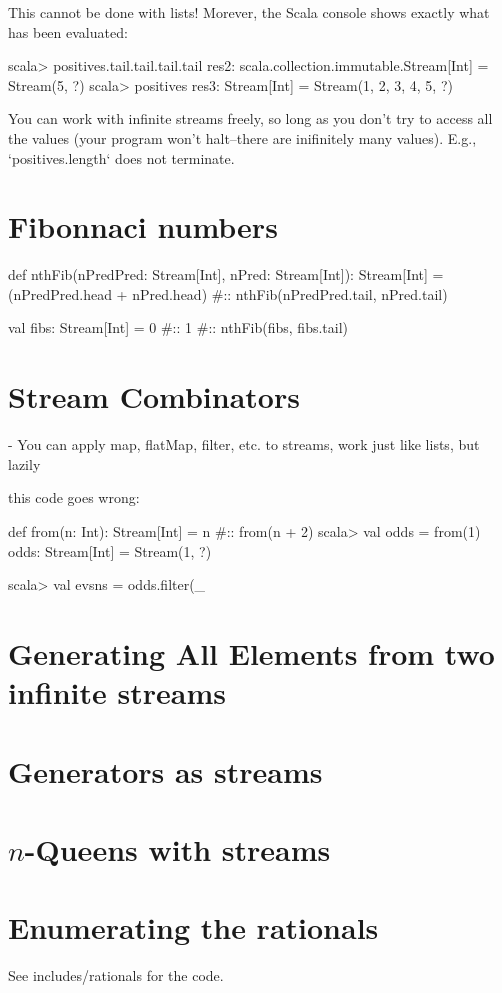 This cannot be done with lists! Morever, the Scala console shows exactly what has
been evaluated:

\begin{console}
scala> positives.tail.tail.tail.tail
res2: scala.collection.immutable.Stream[Int] = Stream(5, ?)
scala> positives
res3: Stream[Int] = Stream(1, 2, 3, 4, 5, ?)
\end{console}

You can work with infinite streams freely, so long as you don't try to access
all the values (your program won't halt--there are inifinitely many values).
E.g., `positives.length` does not terminate.

\section{Fibonnaci numbers}

\begin{scalacode}
def nthFib(nPredPred: Stream[Int], nPred: Stream[Int]): Stream[Int] = {
  (nPredPred.head + nPred.head) #:: nthFib(nPredPred.tail, nPred.tail)
}

val fibs: Stream[Int] = 0 #:: 1 #:: nthFib(fibs, fibs.tail)
\end{scalacode}

\section{Stream Combinators}

- You can apply map, flatMap, filter, etc. to streams, work just like lists, but
  lazily

this code goes wrong:

\begin{scalacode}
def from(n: Int): Stream[Int] = n #:: from(n + 2)
scala> val odds = from(1)
odds: Stream[Int] = Stream(1, ?)

scala> val evsns = odds.filter(_ %
\end{scalacode}

\section{Generating All Elements from two infinite streams}

\section{Generators as streams}

\section{$n$-Queens with streams} 

\section{Enumerating the rationals}

See includes/rationals for the code.


